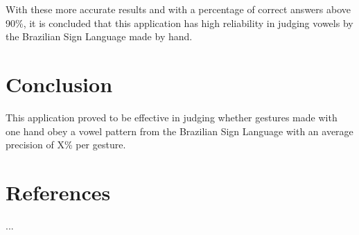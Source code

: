 \documentclass[a4paper, 12pt]{article}
\begin{document}
With these more accurate results and with a percentage of correct answers above 90\%, it is concluded that this application has high reliability in judging vowels by the Brazilian Sign Language made by hand.


\section{Conclusion}

This application proved to be effective in judging whether gestures made with one hand obey a vowel pattern from the Brazilian Sign Language with an average precision of X\% per gesture.





\section{References}

...


\end{document}
